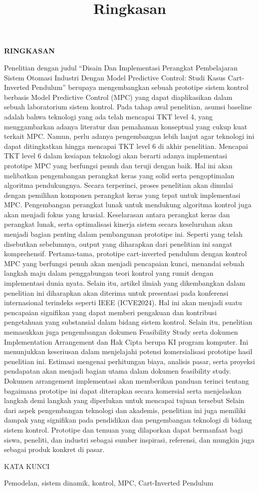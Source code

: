\title{Ringkasan}
\begin{center}
	\large \textbf{RINGKASAN}
\end{center}

Penelitian dengan judul “Disain Dan Implementasi Perangkat Pembelajaran Sistem Otomasi Industri Dengan Model Predictive Control: Studi Kasus Cart-Inverted Pendulum” berupaya mengembangkan sebuah prototipe sistem kontrol berbasis Model Predictive Control (MPC) yang dapat diaplikasikan dalam sebuah laboratorium sistem kontrol. Pada tahap awal penelitian, asumsi baseline adalah bahwa teknologi yang ada telah mencapai TKT level 4, yang menggambarkan adanya literatur dan pemahaman konseptual yang cukup kuat terkait MPC. Namun, perlu adanya pengembangan lebih lanjut agar teknologi ini dapat ditingkatkan hingga mencapai TKT level 6 di akhir penelitian. Mencapai TKT level 6 dalam kesiapan teknologi akan berarti adanya implementasi prototipe MPC yang berfungsi penuh dan teruji dengan baik. Hal ini akan melibatkan pengembangan perangkat keras yang solid serta pengoptimalan algoritma pendukungnya. Secara terperinci, proses penelitian akan dimulai dengan pemilihan komponen perangkat keras yang tepat untuk implementasi MPC. Pengembangan perangkat lunak untuk mendukung algoritma kontrol juga akan menjadi fokus yang krusial. Keselarasan antara perangkat keras dan perangkat lunak, serta optimalisasi kinerja sistem secara keseluruhan akan menjadi bagian penting dalam pembangunan prototipe ini.  Seperti yang telah disebutkan sebelumnya, output yang diharapkan dari penelitian ini sangat komprehensif. Pertama-tama, prototipe cart-inverted pendulum dengan kontrol MPC yang berfungsi penuh akan menjadi pencapaian kunci, menandai sebuah langkah maju dalam penggabungan teori kontrol yang rumit dengan implementasi dunia nyata. Selain itu, artikel ilmiah yang dikembangkan dalam penelitian ini diharapkan akan diterima untuk presentasi pada konferensi internasional terindeks seperti IEEE (ICVE2024). Hal ini akan menjadi suatu pencapaian signifikan yang dapat memberi pengakuan dan kontribusi pengetahuan yang substansial dalam bidang sistem kontrol. Selain itu, penelitian memasukkan juga pengembangan dokumen Feasibility Study serta dokumen Implementation Arrangement dan Hak Cipta berupa KI program komputer. Ini menunjukkan keseriusan dalam menjelajahi potensi komersialisasi prototipe hasil penelitian ini. Estimasi mengenai perhitungan biaya, analisis pasar, serta proyeksi pendapatan akan menjadi bagian utama dalam dokumen feasibility study. Dokumen arrangement implementasi akan memberikan panduan terinci tentang bagaimana prototipe ini dapat diterapkan secara komersial serta menjelaskan langkah demi langkah yang diperlukan untuk mencapai tujuan tersebut Selain dari aspek pengembangan teknologi dan akademis, penelitian ini juga memiliki dampak yang signifikan pada pendidikan dan pengembangan teknologi di bidang sistem kontrol. Prototipe dan temuan yang dilaporkan dapat bermanfaat bagi siswa, peneliti, dan industri sebagai sumber inspirasi, referensi, dan mungkin juga sebagai produk konkret di pasar.
\vspace*{1cm}

\noindent KATA KUNCI

Pemodelan, sistem dinamik, kontrol, MPC, Cart-Inverted Pendulum